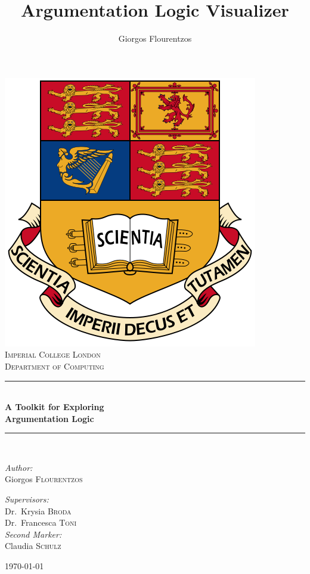 \documentclass[11pt,twoside,a4paper]{report}
\author{Giorgos Flourentzos}
\title{Argumentation Logic Visualizer}
\begin{document}
\begin{titlepage}
\begin{center}

\includegraphics[scale=0.25]{img/pimperial.png}~\\[1cm]

\textsc{\LARGE Imperial College London}\\[1.5cm]

\textsc{\Large Department of Computing}\\[0.5cm]

\rule{\linewidth}{0.5mm} \\[0.4cm]
{ \huge \bfseries A Toolkit for Exploring \\Argumentation Logic \\[0.4cm] }

\rule{\linewidth}{0.5mm} \\[1.5cm]

\begin{minipage}{0.4\textwidth}
\begin{flushleft} \large
\emph{Author:}\\
Giorgos \textsc{Flourentzos}
\end{flushleft}
\end{minipage}
\begin{minipage}{0.4\textwidth}
\begin{flushright} \large
\emph{Supervisors:} \\
Dr.~Krysia \textsc{Broda}\\
Dr.~Francesca \textsc{Toni}\\
\emph{Second Marker:} \\
Claudia \textsc{Schulz}
\end{flushright}
\end{minipage}

\vfill

{\large \today}

\end{center}
\end{titlepage}
\end{document}
